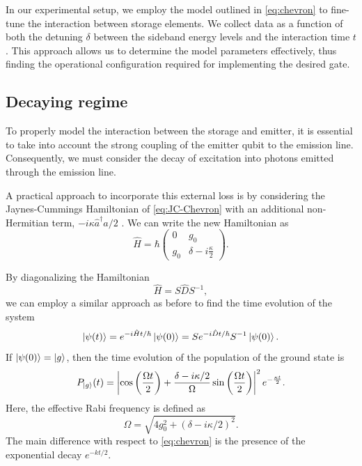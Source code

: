 In our experimental setup, we employ the model outlined in \cref{eq:chevron} to fine-tune the interaction between storage elements. 
We collect data as a function of both the detuning $\delta$ between the sideband energy levels and the interaction time $t$. 
This approach allows us to determine the model parameters effectively, thus finding the operational configuration required for implementing the desired gate.

\subsection{Decaying regime}

To properly model the interaction between the storage and emitter, it is essential to take into account the strong coupling of the emitter qubit to the emission line. 
Consequently, we must consider the decay of excitation into photons emitted through the emission line. 

A practical approach to incorporate this external loss is by considering the Jaynes-Cummings Hamiltonian of \cref{eq:JC-Chevron} with an additional non-Hermitian term, $-i \kappa \hat{a}^\dagger \hat{a} / 2$ \cite{Magnard2021}.
We can write the new Hamiltonian as
\begin{equation}
\label{eq:JC-decay}
    \hat{H} = \hbar
    \begin{pmatrix}
        0       & g_0       \\
        g_0   & \delta - i \frac{\kappa}{2} 
    \end{pmatrix}  .
\end{equation}

By diagonalizing the Hamiltonian
\begin{equation}
    \hat{H} = S \hat{D} S^{-1} ,
\end{equation}
we can employ a similar approach as before to find the time evolution of the system
\begin{equation}
    \ket{\psi (t)} = e^{-i \hat{H} t / \hbar} \ket{\psi(0)}= 
    S e^{-i \hat{D} t / \hbar} S^{-1} \ket{\psi(0)} .
\end{equation}
If $\ket{\psi(0)} = \ket{g}$, then the time evolution of the population of the ground state is
\begin{equation}
\label{eq:chevron_kappa}
    P_{\ket{g}} (t) = 
\left| \cos \left(\frac{\Omega t}{2} \right) + \frac{\delta - i \kappa / 2}{\Omega} \sin \left(\frac{\Omega t}{2} \right) \right|^2 e^{- \frac{\kappa t}{2}} .
\end{equation}
Here, the effective Rabi frequency is defined as
\begin{equation}
\label{eq:eff_Raby_kappa}
    \Omega = \sqrt{4 g_0^2 + \left( \delta - i \kappa / 2 \right)^2} .
\end{equation}
The main difference with respect to \cref{eq:chevron} is the presence of the exponential decay $e^{-kt/2}$.

